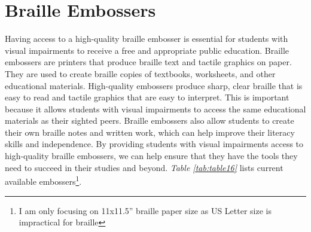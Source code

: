 \pagebreak\hypertarget{embossers}{}\section{Braille Embossers}\label{embossers}
Having access to a high-quality braille embosser is essential for students with visual impairments to receive a free and appropriate public education. Braille embossers are printers that produce braille text and tactile graphics on paper. They are used to create braille copies of textbooks, worksheets, and other educational materials. High-quality embossers produce sharp, clear braille that is easy to read and tactile graphics that are easy to interpret. This is important because it allows students with visual impairments to access the same educational materials as their sighted peers. Braille embossers also allow students to create their own braille notes and written work, which can help improve their literacy skills and independence. By providing students with visual impairments access to high-quality braille embossers, we can help ensure that they have the tools they need to succeed in their studies and beyond. \textit{Table \ref{tab:table16}} lists current available embossers\footnote{\raggedright I am only focusing on 11x11.5'' braille paper size as US Letter size is impractical for braille}.

